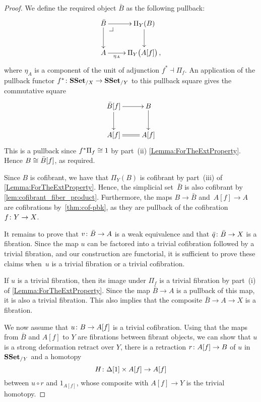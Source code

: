 \documentclass[reqno,10pt,a4paper,oneside,draft]{amsart}
\begin{document}
\begin{proof} We define the required object $\bar{B}$ as the following pullback:
\[\xymatrix{
\bar{B} \ar[d] \ar[r] \drpullback & \Pi_Y(B) \ar[d] \\
A \ar[r]_-{\eta_{A}} & \Pi_Y \big( A[f]  \big) \, ,
}\]
where $\eta_{A}$ is  a component of the unit of adjunction  $f^* \dashv \Pi_f$. An application of the pullback functor $f^* \colon \mathbf{SSet}_{/X} \to \mathbf{SSet}_{/Y}$ to this pullback square gives the commutative square
\[\xymatrix{
\bar{B}[f] \ar[d] \ar[r]  & B \ar[d] \\
A[f] \ar@{=}[r] &A[f] 
}\]
This is a pullback since $f^* \Pi_f \cong 1$ by part~(ii) \cref{Lemma:ForTheExtProperty}. Hence 
$B \cong \bar{B}[f]$, as required.


Since $B$ is cofibrant, we have that $\Pi_Y(B)$ is cofibrant by part~(iii) of  \cref{Lemma:ForTheExtProperty}. Hence, the simplicial set~$\bar{B}$  is also cofibrant by \cref{lem:cofibrant_fiber_product}. Furthermore, the maps $B \rightarrow \bar{B}$ and~$A[f] \rightarrow A$ are cofibrations by~\cref{thm:cof-pbk}, as they are pullback of the cofibration~$f \colon Y \rightarrow X$.





It remains to prove that $v \colon \bar{B} \rightarrow A$ is a weak equivalence and that 
$\bar{q} \colon \bar{B} \rightarrow X$ is a fibration. Since the map $u$ can be factored into a trivial cofibration followed by a trivial fibration, and our construction are functorial, it is sufficient to prove these claims when~$u$ is a trivial fibration or a trivial cofibration.

If $u$ is a trivial fibration, then its image under $\Pi_f$ is a trivial fibration by 
part~(i) of \cref{Lemma:ForTheExtProperty}. Since the map $\bar{B} \rightarrow A$ is a pullback of this map,
it is also a trivial fibration. This also implies that the composite $\bar{B} \rightarrow A \rightarrow X$ is a fibration.


We now assume that $u \colon B \rightarrow A[f]$ is a trivial cofibration. Using that the maps from $\bar{B}$ and $A[f]$ to $Y$ are fibrations between fibrant objects, we can show that $u$ is a strong deformation retract over $Y$, \ie there is a retraction $r \colon A[f] \rightarrow B$ of $u$ in $\mathbf{SSet}_{/Y}$ and a homotopy 
\[
H \colon \Delta[1] \times A[f] \rightarrow A[f]
\] 
between 
$u \circ r$ and $1_{A[f]}$, whose composite with $A[f] \rightarrow Y$ is the trivial homotopy.


\end{proof}
\end{document}
